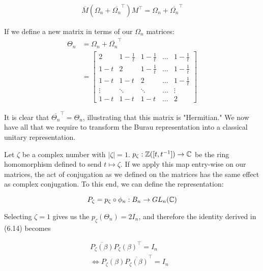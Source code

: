 \begin{equation}
	\begin{aligned}
		\overline{M}(\Omega_n + \overline{\Omega_n}^\intercal )M^\intercal = \Omega_n + \overline{\Omega_n}^\intercal 
	\end{aligned}
\end{equation}

If we define a new matrix in terms of our $\Omega_n$ matrices:
\begin{equation}
	\begin{aligned}
		\Theta_n &= \Omega_n + \overline{\Omega_n}^\intercal \\
					&=  \begin{bmatrix}
						2 & 1-\frac{1}{t} & 1-\frac{1}{t} &\hdots & 1-\frac{1}{t} \\
						1-t & 2 & 1-\frac{1}{t} & \hdots & 1-\frac{1}{t} \\
						1-t & 1-t & 2 & \hdots & 1-\frac{1}{t} \\
						\vdots&\ddots&\ddots&\hdots&\vdots\\
						1-t & 1-t & 1-t & \hdots & 2
					\end{bmatrix}
	\end{aligned}
\end{equation}

It is clear that $\overline{\Theta_n}^\intercal = \Theta_n$, illustrating that this matrix is "Hermitian." We now have all that we require to transform the Burau representation into a classical unitary representation.

Let $\zeta$ be a complex number with $|\zeta|=1$. $p_\zeta:\mathbb{Z}([t,t^{-1}]) \rightarrow \mathbb{C}$ be the ring homomorphism defined to send $t\mapsto\zeta$. If we apply this map entry-wise on our matrices, the act of conjugation as we defined on the matrices has the same effect as complex conjugation. To this end, we can define the representation:

$$P_\zeta = p_\zeta\circ\phi_n: B_n\rightarrow GL_n(\mathbb{C})$$

Selecting $\zeta=1$ gives us the $p_\zeta(\Theta_n) = 2I_n$, and therefore the identity derived in (6.14) becomes

\begin{equation}
	\begin{aligned}
		\overline{P_\zeta(\beta)}P_\zeta(\beta)^\intercal = I_n &\\
		\Leftrightarrow P_\zeta(\beta)\overline{P_\zeta(\beta)}^\intercal  = I_n
	\end{aligned}
\end{equation}

